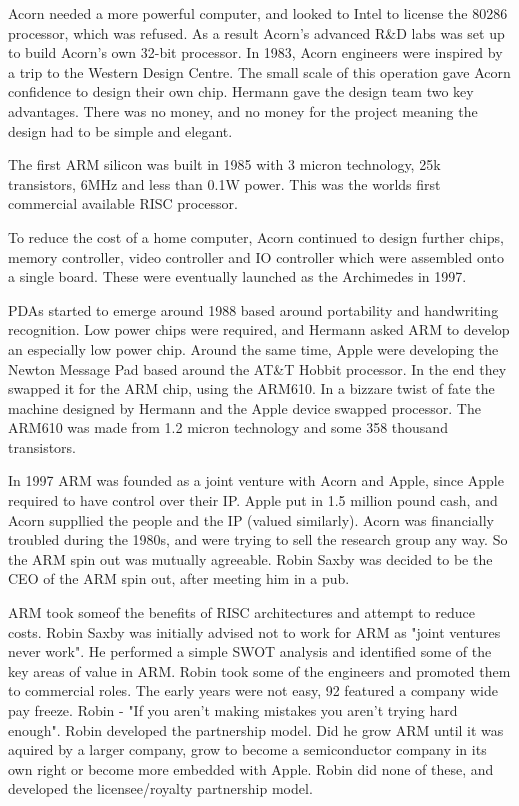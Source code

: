 \documentclass{elec6049Report}     %
\begin{document}
Acorn needed a more powerful computer, and looked to Intel to license the 80286 processor, which was refused. As a result Acorn's advanced R\&D labs was set up to build Acorn's own 32-bit processor. In 1983, Acorn engineers were inspired by a trip to the Western Design Centre. The small scale of this operation gave Acorn confidence to design their own chip. Hermann gave the design team two key advantages. There was no money, and no money for the project meaning the design had to be simple and elegant.

The first ARM silicon was built in 1985 with 3 micron technology, 25k transistors, 6MHz and less than 0.1W power. This was the worlds first commercial available RISC processor. 

To reduce the cost of a home computer, Acorn continued to design further chips, memory controller, video controller and IO controller which were assembled onto a single board. These were eventually launched as the Archimedes in 1997.

PDAs started to emerge around 1988 based around portability and handwriting recognition. Low power chips were required, and Hermann asked ARM to develop an especially low power chip. Around the same time, Apple were developing the Newton Message Pad based around the AT\&T Hobbit processor. In the end they swapped it for the ARM chip, using the ARM610. In a bizzare twist of fate the machine designed by Hermann and the Apple device swapped processor. The ARM610 was made from 1.2 micron technology and some 358 thousand transistors.

In 1997 ARM was founded as a joint venture with Acorn and Apple, since Apple required to have control over their IP. Apple put in 1.5 million pound cash, and Acorn suppllied the people and the IP (valued similarly). Acorn was financially troubled during the 1980s, and were trying to sell the research group any way. So the ARM spin out was mutually agreeable. Robin Saxby was decided to be the CEO of the ARM spin out, after meeting him in a pub. 

ARM took someof the benefits of RISC architectures and attempt to reduce costs. Robin Saxby was initially advised not to work for ARM as "joint ventures never work". He performed a simple SWOT analysis and identified some of the key areas of value in ARM. Robin took some of the engineers and promoted them to commercial roles. The early years were not easy, 92 featured a company wide pay freeze. Robin - "If you aren't making mistakes you aren't trying hard enough". Robin developed the partnership model. Did he grow ARM until it was aquired by a larger company, grow to become a semiconductor company in its own right or become more embedded with Apple. Robin did none of these, and developed the licensee/royalty partnership model. 
\end{document}
